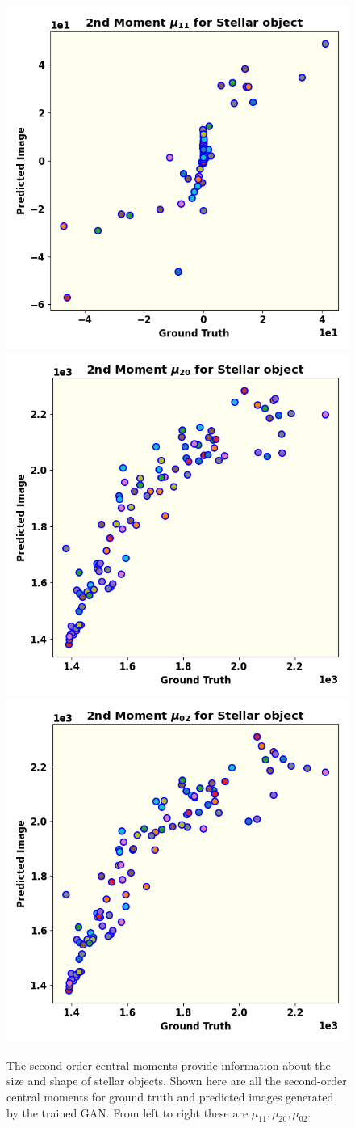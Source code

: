 \begin{figure}
  \includegraphics[width=.32\linewidth]{fig/moments/mom3.png}\hfil
  \includegraphics[width=.32\linewidth]{fig/moments/mom4.png}\hfil
  \includegraphics[width=.32\linewidth]{fig/moments/mom5.png}\hfil
  \caption{The second-order central moments provide information about the size and shape of stellar objects.  Shown here are all the second-order central moments for ground truth and predicted images generated by the trained GAN. From left to right these are $\mu_{11},\mu_{20},\mu_{02}$.}
	\label{fig:struc}
\end{figure}
